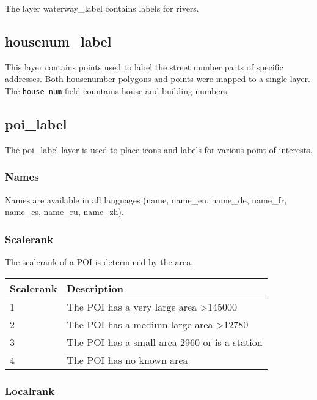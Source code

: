 The layer waterway\_label contains labels for rivers.

\subsection*{housenum\_label}

This layer contains points used to label the street number parts of
specific addresses. Both housenumber polygons and points were mapped to
a single layer.
The \texttt{house\_num} field countains house and building numbers.

\subsection*{poi\_label}

The poi\_label layer is used to place icons and labels for various point
of interests.

\subsubsection*{Names}

Names are available in all languages (name, name\_en, name\_de,
name\_fr, name\_es, name\_ru, name\_zh).

\subsubsection*{Scalerank}

The scalerank of a POI is determined by the area.

\begin{table}[H]
\label{my-label}
\begin{tabular}{l | l}
Scalerank & Description                                       \\ \hline
1         & The POI has a very large area \textgreater145000  \\
2         & The POI has a medium-large area \textgreater12780 \\
3         & The POI has a small area 2960 or is a station     \\
4         & The POI has no known area                        
\end{tabular}
\end{table}

\subsubsection*{Localrank}

